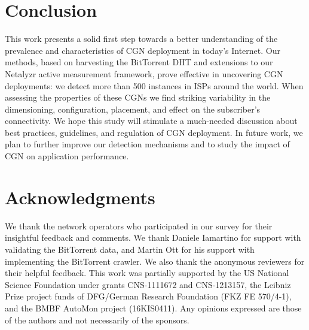 \documentclass[10pt]{sig-alternate-05-2015}
\newcommand{\neta}{Netalyzr\xspace}
\begin{document}
\section{Conclusion}
This work presents a solid first step towards a better understanding
of the prevalence and characteristics of CGN deployment in today's
Internet. Our methods, based on harvesting the BitTorrent DHT and
extensions to our \neta active measurement framework, prove effective
in uncovering CGN deployments: we detect more than 500 instances in
ISPs around the world. When assessing the properties of these CGNs we
find striking variability in the dimensioning, configuration,
placement, and effect on the subscriber's connectivity. We hope this
study will stimulate a much-needed discussion about best practices,
guidelines, and regulation of CGN deployment. In future work, we plan
to further improve our detection mechanisms and to study the impact of
CGN on application performance.

\section*{Acknowledgments}
\label{sec:acks}

We thank the network operators who participated in our survey for their 
insightful feedback and comments. We thank Daniele Iamartino for support with 
validating the BitTorrent data, and Martin Ott for his support with implementing
the BitTorrent crawler. We also thank the anonymous reviewers for their helpful 
feedback. This work was partially supported by the
US National Science Foundation under grants CNS-1111672 and CNS-1213157,
the Leibniz Prize 
project funds of DFG/German Research Foundation (FKZ FE 570/4-1), and
the BMBF AutoMon project (16KIS0411).  Any
opinions expressed are those of the authors and not necessarily of
the sponsors.



\end{document}
